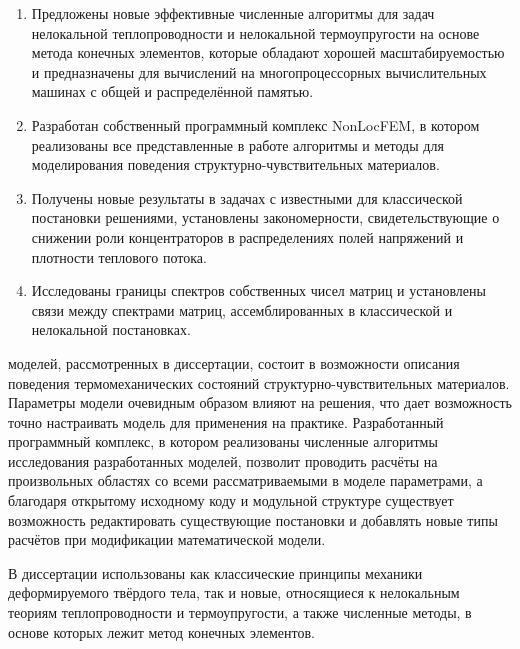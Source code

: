 {\novelty}
\begin{enumerate}[beginpenalty=10000] %
  \item Предложены новые эффективные численные алгоритмы для задач нелокальной теплопроводности и нелокальной термоупругости на основе метода конечных элементов, которые обладают хорошей масштабируемостью и предназначены для вычислений на многопроцессорных вычислительных машинах с общей и распределённой памятью.
  \item Разработан собственный программный комплекс NonLocFEM, в котором реализованы все представленные в работе алгоритмы и методы для моделирования поведения структурно-чувствительных материалов.
  \item Получены новые результаты в задачах с известными для классической постановки решениями, установлены закономерности, свидетельствующие о снижении роли концентраторов в распределениях полей напряжений и плотности теплового потока.
  \item Исследованы границы спектров собственных чисел матриц и установлены связи между спектрами матриц, ассемблированных в классической и нелокальной постановках.
\end{enumerate}

{\influence}
моделей, рассмотренных в диссертации, состоит в возможности описания поведения термомеханических состояний структурно-чувствительных материалов. Параметры модели очевидным образом влияют на решения, что дает возможность точно настраивать модель для применения на практике. Разработанный программный комплекс, в котором реализованы численные алгоритмы исследования разработанных моделей, позволит проводить расчёты на произвольных областях со всеми рассматриваемыми в моделе параметрами, а благодаря открытому исходному коду и модульной структуре существует возможность редактировать существующие постановки и добавлять новые типы расчётов при модификации математической модели.

{\methods}
В диссертации использованы как классические принципы механики деформируемого твёрдого тела, так и новые, относящиеся к нелокальным теориям теплопроводности и термоупругости, а также численные методы, в основе которых лежит метод конечных элементов.

